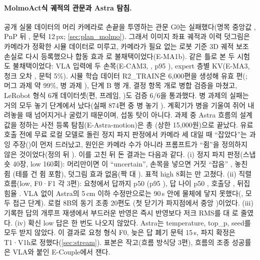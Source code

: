 \paragraph{MolmoAct식 궤적의 관문과 Astra 탐침.} 공개 실물 데이터의 머리 카메라로 손끝을 투영하는 관문 G0는 실패했다(명목 중앙값 , PnP 뒤 , 문턱 12\,px; \cref{sec:plan_molmo}). 그래서 이미지 좌표 궤적과 이력 덧그림은 카메라가 정확한 시뮬 데이터로 미루고, 카메라가 필요 없는 로봇 기준 3D 궤적 보조 손실로 다시 등록했으나 합동 효과 로 불채택이었다(E-MA1b). 같은 틀로 본 두 시험도 불채택이었다: VLA 입력에 두 손목(E-CAM3, , p95 ), expert 층별 KV(E-MA3, 청크 오차 , 문턱 5\%). 시뮬 학습 데이터 R2\_TRAIN은 6,000편을 생성해 유효 편(; 머그 과제 약 99\%, 병 과제 ), 단계 B 행 개, 결정 항목 개로 병합 검증을 마쳤고, LeRobot 형식 6개 데이터셋(편, 프레임, )도 검증 6/6을 통과했다. 병 과제의 실패는 거의 모두 놓기 단계에서 났다(실패 874편 중 병 놓기 ). 계획기가 병을  기울여 쥐어 내려놓을 때 넘어지거나 굴렀기 때문이며, 섭동 탓이 아니다. 과제 중 Astra 흐름의 설계값을 정하는 사전 등록 탐침(E-Astra-motion)은 총 (상한 15,000원)으로 끝났다. 유료 호출 전에 무료 로컬 모델로 돌린 정지 파지 판정에서 카메라 세 대일 때 ``잡았다''는 과잉 주장()이 먼저 드러났고, 원인은 카메라 수가 아니라 프롬프트가 ``쥠''을 정의하지 않은 것이었다(정의 뒤 ). 이를 고친 뒤 돈 결과는 다음과 같다. (i) 정지 파지 판정(스냅숏 40장, low 160회): 머리만이면 이 ``uncertain'', 손목을 넣으면 거짓 ``잡음'' , 놓친 쥠 (테를 건 쥠  포함), 덧그림 효과 없음(짝  대 ). 표적 high 8회는 만 고쳤다. (ii) 직렬 흐름(low, F0·F1 각 3편): 요청에서 답까지 p50 (p95 ), 답 나이 p50 , 호출당 , 뒤집힘율 . VLA 없이 Astra의 5\,cm 이하 수정만으로는 90\,s 안에 물체에 닿지 못했다(, 모두 접근 단계). 로컬 8B의 동기 조종 20편도 (첫 닫기가 파지점에서 중앙 )이었다. (iii) 기록한 답의 개루프 재생에서 부드러운 반영은 즉시 반영보다 저크 RMS를  대 로 줄였다. (iv) 확신 low 답은 한 번도 나오지 않았다. Astra는 temperature, top\_p, seed를 모두 받지 않았다. 이 결과로 요청 형식 F0, 늦은 답 폐기 문턱 15\,s, 파지 확정은 T1·V1h로 정했다(\cref{sec:stream}). 표본은 작고(흐름 방식당 3편), 흐름의 조종 성공률은 VLA와 붙인 E-Couple에서 잰다.

